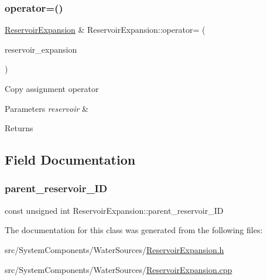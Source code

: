 \mbox{\label{classReservoirExpansion_af197058813986b16c34ae206c04e14bf_af197058813986b16c34ae206c04e14bf}} 
\subsubsection{\texorpdfstring{operator=()}{operator=()}}
{\footnotesize\ttfamily \mbox{\hyperlink{classReservoirExpansion}{Reservoir\+Expansion}} \& Reservoir\+Expansion\+::operator= (\begin{DoxyParamCaption}\item[{const \mbox{\hyperlink{classReservoirExpansion}{Reservoir\+Expansion}} \&}]{reservoir\+\_\+expansion }\end{DoxyParamCaption})}

Copy assignment operator 
\begin{DoxyParams}{Parameters}
{\em reservoir} & \\
\hline
\end{DoxyParams}
\begin{DoxyReturn}{Returns}

\end{DoxyReturn}


\subsection{Field Documentation}
\mbox{\label{classReservoirExpansion_a56527196174404cfed20b863df2ab0ba_a56527196174404cfed20b863df2ab0ba}} 
\subsubsection{\texorpdfstring{parent\+\_\+reservoir\+\_\+\+ID}{parent\_reservoir\_ID}}
{\footnotesize\ttfamily const unsigned int Reservoir\+Expansion\+::parent\+\_\+reservoir\+\_\+\+ID}



The documentation for this class was generated from the following files\+:\begin{DoxyCompactItemize}
\item 
src/\+System\+Components/\+Water\+Sources/\mbox{\hyperlink{ReservoirExpansion_8h}{Reservoir\+Expansion.\+h}}\item 
src/\+System\+Components/\+Water\+Sources/\mbox{\hyperlink{ReservoirExpansion_8cpp}{Reservoir\+Expansion.\+cpp}}\end{DoxyCompactItemize}
